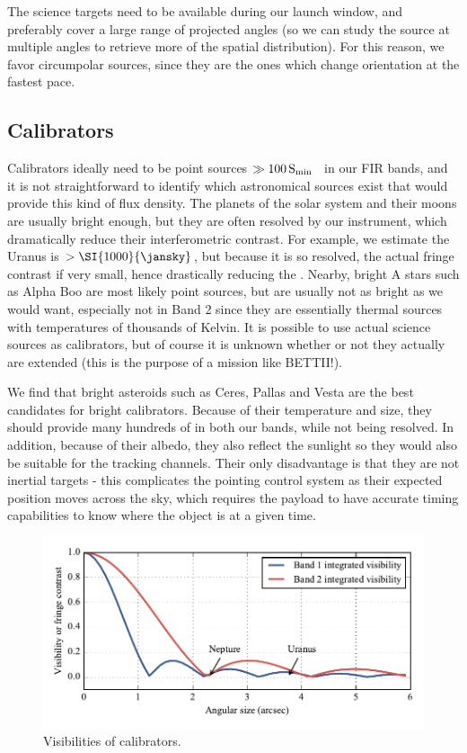 The science targets need to be available during our launch window, and preferably cover a large range of projected angles (so we can study the source at multiple angles to retrieve more of the spatial distribution). For this reason, we favor circumpolar sources, since they are the ones which change orientation at the fastest pace.


\subsection{Calibrators}

Calibrators ideally need to be point sources $\gg\SI{100}S_\textrm{min}$~\si{\jansky} in our FIR bands, and it is not straightforward to identify which astronomical sources exist that would provide this kind of flux density. The planets of the solar system and their moons are usually bright enough, but they are often resolved by our instrument, which dramatically reduce their interferometric contrast. For example, we estimate the Uranus is $>\SI{1000}{\jansky}$, but because it is so resolved, the actual fringe contrast if very small, hence drastically reducing the \SNR. Nearby, bright A stars such as Alpha Boo are most likely point sources, but are usually not as bright as we would want, especially not in Band 2 since they are essentially thermal sources with temperatures of thousands of Kelvin. It is possible to use actual science sources as calibrators, but of course it is unknown whether or not they actually are extended (this is the purpose of a mission like BETTII!). 

We find that bright asteroids such as Ceres, Pallas and Vesta are the best candidates for bright calibrators. Because of their temperature and size, they should provide many hundreds of \si{\jansky} in both our bands, while not being resolved. In addition, because of their albedo, they also reflect the sunlight so they would also be suitable for the tracking channels. Their only disadvantage is that they are not inertial targets - this complicates the pointing control system as their expected position moves across the sky, which requires the payload to have accurate timing capabilities to know where the object is at a given time.

\begin{figure}[!h]
	\centering
	\includegraphics[width=\textwidth]{Figures/Visibilities.pdf}
	\caption[Visibilities of calibrators]{Visibilities of calibrators.}
	\label{fig:Visibilities}
    \end{figure}


